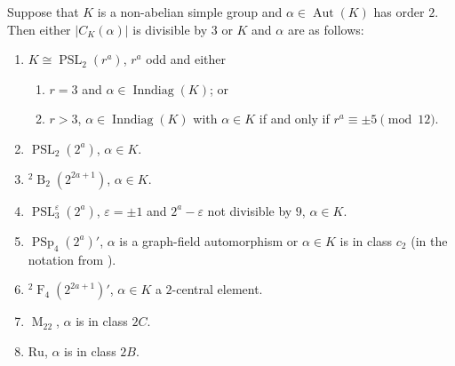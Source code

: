 \documentclass[12pt,a4paper]{amsart}
\DeclareMathOperator{\Aut}{Aut}
\DeclareMathOperator{\Inndiag}{Inndiag}
\DeclareMathOperator{\M}{M}
\DeclareMathOperator{\B}{B}
\DeclareMathOperator{\F}{F}
\DeclareMathOperator{\PSL}{PSL}
\DeclareMathOperator{\PSp}{PSp}
\renewcommand{\epsilon}{\varepsilon}
\newcommand{\eps}{\epsilon}
\begin{document}
 \begin{proposition}\label{lem:cop3}
 Suppose that $K$ is a non-abelian simple group  and $\alpha\in \Aut(K)$ has order $2$. Then either $|C_K(\alpha)|$ is divisible by $3$ or  $K$ and $\alpha$ are as follows:
 \begin{enumerate}
\item $K\cong \PSL_2(r^a)$, $r^a$ odd and either
 \begin{enumerate} \item $r=3$ and   $\alpha \in \Inndiag(K)$; or
 \item $r > 3$, $\alpha \in \Inndiag(K)$ with  $\alpha \in K$ if and only if $r^a\equiv \pm 5 \pmod {12}$.
 \end{enumerate}
 \item $\PSL_2(2^a)$, $\alpha \in K$.
 \item ${}^2\B_2(2^{2a+1})$, $\alpha \in K$.
 \item $\PSL_3^\eps(2^a)$, $\eps=\pm 1$  and $2^a-\eps$   not divisible by $9$, $\alpha\in K$.
\item $\PSp_4(2 ^a)'$,   $\alpha$ is a  graph-field automorphism or $\alpha \in K$ is in class $c_2$ (in the notation from \cite[(7.6)]{AschbacherSeitz}).
\item ${}^2\F_4(2^{2a+1})'$, $\alpha \in K$ a $2$-central element.
\item $\M_{22}$,   $\alpha$ is in class $2C$.
\item $\mathrm{Ru}$,  $\alpha$ is in class $2B$.
 \end{enumerate}
 \end{proposition}
\end{document}
